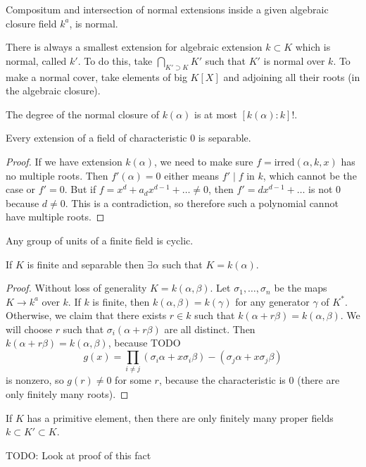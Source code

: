 \begin{theorem}
    Compositum and intersection of normal extensions inside a given algebraic closure field $k^a$, is normal.
\end{theorem}

\begin{theorem}
    There is always a smallest extension for algebraic extension $k \subset K$
    which is normal, called $k'$. To do this, take $\bigcap_{K' \supset K} K'$
    such that $K'$ is normal over $k$.
    To make a normal cover, take elements of big $K[X]$ and adjoining all their roots (in the algebraic closure).
\end{theorem}

The degree of the normal closure of $k(\alpha)$ is at most $[k(\alpha): k]!$.

\begin{theorem}
    Every extension of a field of characteristic $0$ is separable.
    \begin{proof}
        If we have extension $k(\alpha)$,
        we need to make sure $f = \textrm{irred}(\alpha, k , x)$
        has no multiple roots. Then
        $f'(\alpha) = 0$ either means $f' \mid f$ in $k$, which cannot be the case
        or $f' = 0$. But if $f = x^d + a_d x^{d- 1} + \dots \neq 0$,
        then $f' = dx^{d - 1} + \dots$ is not $0$ because $d \neq 0$.
        This is a contradiction, so therefore such a polynomial cannot have multiple roots.
    \end{proof}
\end{theorem}

\begin{theorem}
    Any group of units of a finite field is cyclic.
\end{theorem}

\begin{theorem}
    If $K$ is finite and separable then $\exists \alpha$ such that $K = k(\alpha)$.
    \begin{proof}
        Without loss of generality $K = k(\alpha, \beta)$.
        Let $\sigma_1, \dots, \sigma_n$ be the maps $K \to k^a$ over $k$.
        If $k$ is finite, then $k(\alpha, \beta) = k(\gamma)$
        for any generator $\gamma$ of $K^*$. Otherwise, we claim
        that there exists $r \in k$ such that $k(\alpha + r \beta) = k(\alpha, \beta)$.
        We will choose $r$ such that $\sigma_i (\alpha + r \beta)$ are all distinct.
        Then $k(\alpha + r \beta) = k(\alpha, \beta)$, because TODO
        \[ g(x) = \prod_{i \neq j}  (\sigma_i \alpha + x \sigma_i \beta) - (\sigma_j \alpha + x \sigma_j \beta)\]
        is nonzero, so $g(r) \neq 0$ for some $r$, because the characteristic is $0$ (there are only finitely many roots).
    \end{proof}
\end{theorem}

\begin{theorem}
    If $K$ has a primitive element, then there are only finitely many proper fields $k \subset K' \subset K$.
\end{theorem}
TODO: Look at proof of this fact